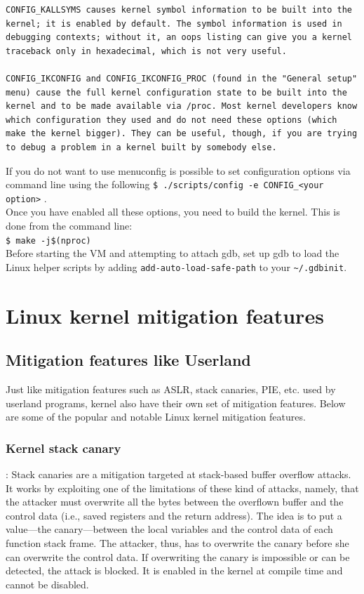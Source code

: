 \documentclass{masterthesis}
\newcommand{\glnote}[1]{\todo[color=blue!20]{#1}}
\begin{document}
\begin{lstlisting}
CONFIG_KALLSYMS causes kernel symbol information to be built into the kernel; it is enabled by default. The symbol information is used in debugging contexts; without it, an oops listing can give you a kernel traceback only in hexadecimal, which is not very useful.

CONFIG_IKCONFIG and CONFIG_IKCONFIG_PROC (found in the "General setup" menu) cause the full kernel configuration state to be built into the kernel and to be made available via /proc. Most kernel developers know which configuration they used and do not need these options (which make the kernel bigger). They can be useful, though, if you are trying to debug a problem in a kernel built by somebody else.
\end{lstlisting}

If you do not want to use menuconfig is possible to set configuration options via command line using the following
\lstinline{$ ./scripts/config -e CONFIG_<your option>} .\\
Once you have enabled all these options, you need to build the kernel.
This is done from the command line:\\
\lstinline{$ make -j$(nproc)}\\
Before starting the VM and attempting to attach gdb, set up gdb to load the Linux helper scripts by adding \lstinline{add-auto-load-safe-path} to your \lstinline{~/.gdbinit}.

\chapter{Linux kernel mitigation features}
\label{ch:mitigation}
\section{Mitigation features like Userland}
\label{sect:like userland}
Just like mitigation features such as ASLR, stack canaries, PIE, etc. used by userland programs, kernel also have their own set of mitigation features. Below are some of the popular and notable Linux kernel mitigation features.

\subsection{Kernel stack canary}:
\label{subsect:canary}
\glnote{nel titolo usi cookie, ma poi parli di canary\ldots}
Stack canaries are a mitigation targeted at stack-based buffer overflow attacks. It works by exploiting one of the limitations of these kind of attacks, namely, that the attacker must overwrite all the bytes between the overflown buffer and the control data (i.e., saved registers and the return address). The idea is to put a value—the canary—between the local variables and the control data of each function stack frame. The attacker, thus, has to overwrite the canary before she can overwrite the control data. If overwriting the canary is impossible or can be detected, the attack is blocked.
It is enabled in the kernel at compile time and cannot be disabled.
\end{document}
